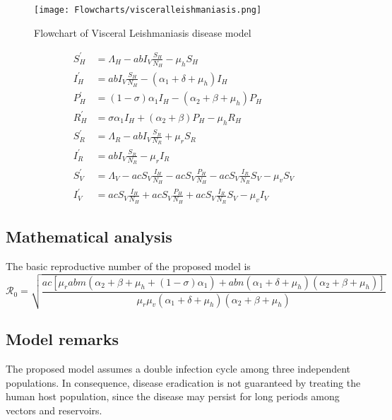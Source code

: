\documentclass{book}\usepackage[]{graphicx}\usepackage[]{color}
\begin{document}
\begin{figure}[H]
    \centering
    \texttt{[image: Flowcharts/visceralleishmaniasis.png]}
    \caption{Flowchart of Visceral Leishmaniasis disease model}
    \label{fig:leishmaniasis_flow}
\end{figure}

\begin{equation}
\begin{split}
S_{H}^{\prime}&=\Lambda_{H}-a b I_{V} \frac{S_{H}}{N_{H}}-\mu_{h} S_{H} \\
I_{H}^{\prime}&=a b I_{V} \frac{S_{H}}{N_{H}}-\left(\alpha_{1}+\delta+\mu_{h}\right) I_{H} \\
P_{H}^{\prime}&=(1-\sigma) \alpha_{1} I_{H}-\left(\alpha_{2}+\beta+\mu_{h}\right) P_{H} \\
R_{H}^{\prime}&=\sigma \alpha_{1} I_{H}+\left(\alpha_{2}+\beta\right) P_{H}-\mu_{h} R_{H} \\
S_{R}^{\prime}&=\Lambda_{R}-a b I_{V} \frac{S_{R}}{N_{R}}+\mu_{r} S_{R} \\
I_{R}^{\prime}&=a b I_{V} \frac{S_{R}}{N_{R}}-\mu_{r} I_{R} \\
S_{V}^{\prime}&=\Lambda_{V}-a c S_{V} \frac{I_{H}}{N_{H}}-a c S_{V} \frac{P_{H}}{N_{H}}-a c S_{V} \frac{I_{R}}{N_{R}} S_{V}-\mu_{v} S_{V} \\
I_{V}^{\prime}&=a c S_{V} \frac{I_{H}}{N_{H}}+a c S_{V} \frac{P_{H}}{N_{H}}+a c S_{V} \frac{I_{R}}{N_{R}} S_{V}-\mu_{v} I_{V}
\end{split}
\end{equation}

\subsection*{Mathematical analysis}
The basic reproductive number of the proposed model is
\begin{equation}
\mathcal{R}_0=
\sqrt{\frac{a c\left[\mu_{r} a b m\left(\alpha_{2}+\beta+\mu_{h}+(1-\sigma) \alpha_{1}\right)+a b n\left(\alpha_{1}+\delta+\mu_{h}\right)\left(\alpha_{2}+\beta+\mu_{h}\right)\right]}{\mu_{r} \mu_{v}\left(\alpha_{1}+\delta+\mu_{h}\right)\left(\alpha_{2}+\beta+\mu_{h}\right)}}
\end{equation}

\subsection*{Model remarks}
The proposed model assumes a double infection cycle among three independent populations. In consequence, disease eradication is not guaranteed by treating the human host population, since the disease may persist for long periods among vectors and reservoirs.
\end{document}
